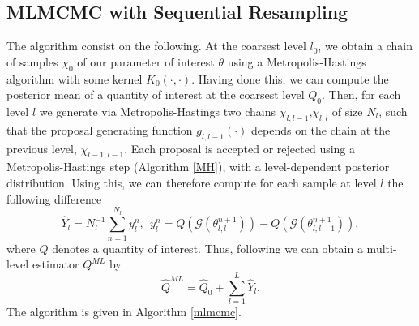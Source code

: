  \subsection{MLMCMC with Sequential Resampling}
The algorithm consist on the following. At the coarsest level $l_0$, we obtain a chain of samples $\chi_0$ of our parameter of interest $\theta$ using a Metropolis-Hastings algorithm with some kernel $K_0(\cdot,\cdot)$. Having done this, we can compute the posterior mean  of a quantity of interest at the coarsest level $Q_0$. Then, for each level $l$ we generate via Metropolis-Hastings two chains $\chi_{l,l-1}$,$\chi_{l,l}$ of size $N_l$, such that the proposal generating function $g_{l,l-1}(\cdot)$ depends on the chain at the previous level, $\chi_{l-1,l-1}$. Each proposal is accepted or rejected using a Metropolis-Hastings step (Algorithm \ref{MH}), with a level-dependent posterior distribution. Using this, we can therefore compute for each sample at level $l$ the following difference$$\hat{Y}_l=N_l^{-1}\sum_{n=1}^{N_l}y_l^n,\ \ y^n_l=Q( \mathcal{G}(\theta_{l,l}^{n+1}))-Q(\mathcal{G}(\theta^{n+1}_{l,l-1})),$$
where $Q$ denotes a quantity of interest. Thus, following \cite{giles2015multilevel} we can obtain a multi-level estimator $Q^{ML}$ by 	$$\hat{Q}^{ML}=\hat{Q}_0+\sum_{l=1}^L\hat{Y}_l.$$	
The algorithm is given in Algorithm \ref{mlmcmc}.

